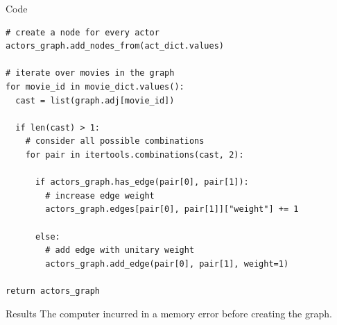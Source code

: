 \begin{frame}[fragile]{Code}
\begin{lstlisting}
# create a node for every actor
actors_graph.add_nodes_from(act_dict.values) 

# iterate over movies in the graph
for movie_id in movie_dict.values():  
  cast = list(graph.adj[movie_id])
  
  if len(cast) > 1:
    # consider all possible combinations
    for pair in itertools.combinations(cast, 2):
    
      if actors_graph.has_edge(pair[0], pair[1]):  
        # increase edge weight
        actors_graph.edges[pair[0], pair[1]]["weight"] += 1 
        
      else: 
        # add edge with unitary weight
        actors_graph.add_edge(pair[0], pair[1], weight=1)  

return actors_graph
\end{lstlisting}
\end{frame}
\begin{frame}{Results}
The computer incurred in a memory error before creating the graph.
\end{frame}

